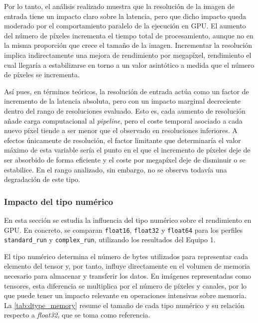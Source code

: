 \vspace{2em}

Por lo tanto, el análisis realizado muestra que la resolución de la imagen de entrada tiene un impacto claro sobre la 
latencia, pero que dicho impacto queda moderado por el comportamiento paralelo de la ejecución en GPU.
El aumento del número de píxeles incrementa el tiempo total de procesamiento, aunque no en la misma proporción que 
crece el tamaño de la imagen. Incrementar la resolución implica indirectamente una mejora de rendimiento por megapíxel, 
rendimiento el cual llegaría a estabilizarse en torno a un valor asintótico a medida que el número de píxeles
se incrementa. 

Así pues, en términos teóricos, la resolución de entrada actúa como un factor de incremento de la 
latencia absoluta, pero con un impacto marginal decreciente dentro del rango de resoluciones evaluado. Esto es,
cada aumento de resolución añade carga computacional al \textit{pipeline}, pero el coste temporal asociado a cada 
nuevo píxel tiende a ser menor que el observado en resoluciones inferiores. A efectos únicamente de resolución,
el factor limitante que determinaría el valor máximo de esta variable sería el punto en el que el incremento de 
píxeles deje de ser absorbido de forma eficiente y el coste por megapíxel deje de disminuir o se estabilice. En el 
rango analizado, sin embargo, no se observa todavía una degradación de este tipo.

\newpage

\subsubsection{Impacto del tipo numérico} \label{subsubsec:data_type_impact}

En esta sección se estudia la influencia
del tipo numérico sobre el rendimiento en GPU. En concreto, se comparan
\texttt{float16}, \texttt{float32} y \texttt{float64} para los perfiles
\texttt{standard\_run} y \texttt{complex\_run}, utilizando los resultados del Equipo 1.


El tipo numérico determina el número de bytes utilizados para representar cada elemento 
del tensor y, por tanto, influye directamente en el volumen de memoria necesario para almacenar 
y transferir los datos. En imágenes representadas como tensores, esta diferencia se multiplica 
por el número de píxeles y canales, por lo que puede tener un impacto relevante en operaciones 
intensivas sobre memoria. La \autoref{tab:dtype_memory} resume el tamaño de cada tipo numérico 
y su relación respecto a \textit{float32}, que se toma como referencia.

